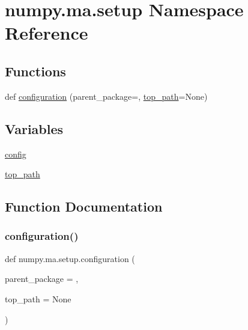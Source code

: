 \hypertarget{namespacenumpy_1_1ma_1_1setup}{}\section{numpy.\+ma.\+setup Namespace Reference}
\label{namespacenumpy_1_1ma_1_1setup}
\subsection*{Functions}
\begin{DoxyCompactItemize}
\item 
def \hyperlink{namespacenumpy_1_1ma_1_1setup_a6475d022f317b5daafb2b194c74d92dc}{configuration} (parent\+\_\+package=\textquotesingle{}\textquotesingle{}, \hyperlink{namespacenumpy_1_1ma_1_1setup_a03614fd9a23dfeff4e4f1ed4344feea7}{top\+\_\+path}=None)
\end{DoxyCompactItemize}
\subsection*{Variables}
\begin{DoxyCompactItemize}
\item 
\hyperlink{namespacenumpy_1_1ma_1_1setup_aa68c0fbb54fd135a81ba605a4ade81f8}{config}
\item 
\hyperlink{namespacenumpy_1_1ma_1_1setup_a03614fd9a23dfeff4e4f1ed4344feea7}{top\+\_\+path}
\end{DoxyCompactItemize}


\subsection{Function Documentation}
\mbox{\label{namespacenumpy_1_1ma_1_1setup_a6475d022f317b5daafb2b194c74d92dc}} 
\subsubsection{\texorpdfstring{configuration()}{configuration()}}
{\footnotesize\ttfamily def numpy.\+ma.\+setup.\+configuration (\begin{DoxyParamCaption}\item[{}]{parent\+\_\+package = {\ttfamily \textquotesingle{}\textquotesingle{}},  }\item[{}]{top\+\_\+path = {\ttfamily None} }\end{DoxyParamCaption})}



